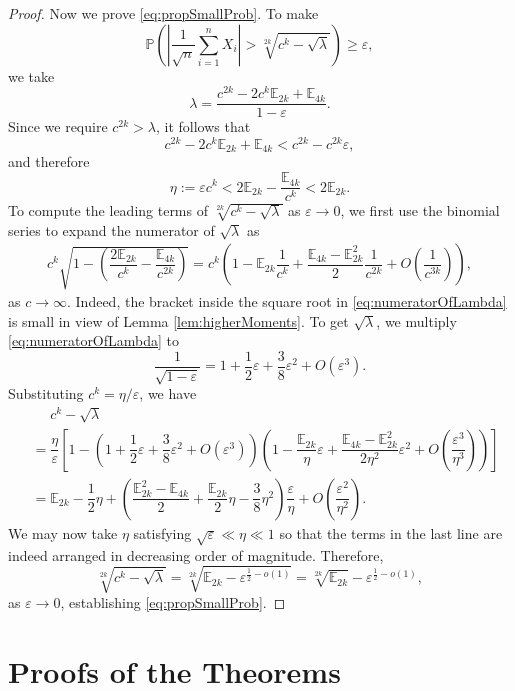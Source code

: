 \documentclass{amsart}
\theoremstyle{plain}
\theoremstyle{definition}
\newcommand{\eps}{\varepsilon}
\newcommand{\EE}{\mathbb{E}}
\begin{document}
\begin{proof}
Now we prove \eqref{eq:propSmallProb}. To make
\[
\mathbb{P}\left(\left|\dfrac{1}{\sqrt{n}}\sum_{i=1}^{n}X_i\right|>\sqrt[2k]{c^{k}-\sqrt{\lambda}}\right)\geq\eps,
\]
we take
\[
\lambda=\dfrac{c^{2k}-2c^{k}\EE_{2k}+\EE_{4k}}{1-\eps}.
\]
Since we require $c^{2k}>\lambda$, it follows that
\[
c^{2k}-2c^k\EE_{2k}+\EE_{4k}<c^{2k}-c^{2k}\eps,
\]
and therefore
\[
\eta:=\eps{c^k}<2\EE_{2k}-\dfrac{\EE_{4k}}{c^k}<2\EE_{2k}.
\]
To compute the leading terms of $\sqrt[2k]{c^k-\sqrt{\lambda}}$ as $\eps\to0$, we first use the binomial series to expand the numerator of $\sqrt{\lambda}$ as
\begin{equation}
\label{eq:numeratorOfLambda}
\begin{split}
c^{k}\sqrt{1-\left(\dfrac{2\EE_{2k}}{c^k}-\dfrac{\EE_{4k}}{c^{2k}}\right)}
=c^{k}\left(1-\EE_{2k}\dfrac{1}{c^k}+\dfrac{\EE_{4k}-\EE_{2k}^2}{2}\dfrac{1}{c^{2k}}+O\left(\dfrac{1}{c^{3k}}\right)\right),
\end{split}
\end{equation}
as $c\to\infty$. Indeed, the bracket inside the square root in \eqref{eq:numeratorOfLambda} is small in view of Lemma \ref{lem:higherMoments}. To get $\sqrt\lambda$, we multiply \eqref{eq:numeratorOfLambda} to
\[
\dfrac{1}{\sqrt{1-\eps}}=1+\dfrac12\eps+\dfrac38\eps^2+O(\eps^3).
\]
Substituting $c^{k} = \eta/\eps$, we have
\[
\begin{split}
&\quad\,\,c^{k}-\sqrt{\lambda}\\
&=\dfrac{\eta}{\eps}\left[1-\left(1+\dfrac12\eps+\dfrac38\eps^2+O(\eps^3)\right)\left(1-\dfrac{\EE_{2k}}{\eta}\eps+\dfrac{\EE_{4k}-\EE_{2k}^2}{2\eta^2}\eps^2+O\left(\dfrac{\eps^3}{\eta^3}\right)\right)\right]\\
&=\EE_{2k}-\dfrac{1}{2}\eta+\left(\dfrac{\EE_{2k}^2-\EE_{4k}}{2}+\dfrac{\EE_{2k}}{2}\eta-\dfrac{3}{8}\eta^{2}\right)\dfrac{\eps}{\eta}+O\left(\dfrac{\eps^2}{\eta^2}\right).
\end{split}
\]
We may now take $\eta$ satisfying $\sqrt\eps\ll\eta\ll1$ so that the terms in the last line are indeed arranged in decreasing order of magnitude. Therefore,
\[
\sqrt[2k]{c^k-\sqrt\lambda}=\sqrt[2k]{\EE_{2k}-\eps^{\frac12-o(1)}}=\sqrt[2k]{\EE_{2k}}-\eps^{\frac12-o(1)},
\]
as $\eps\to0$, establishing \eqref{eq:propSmallProb}.
\end{proof}

\section{Proofs of the Theorems}
\end{document}
